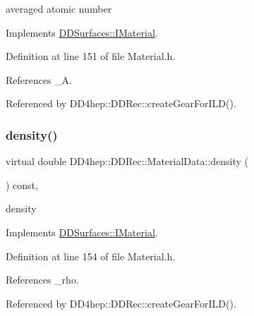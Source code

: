 averaged atomic number 



Implements \hyperlink{class_d_d_surfaces_1_1_i_material_a02f156030abe09aa3ebe9a4c99b059b2}{D\+D\+Surfaces\+::\+I\+Material}.



Definition at line 151 of file Material.\+h.



References \+\_\+A.



Referenced by D\+D4hep\+::\+D\+D\+Rec\+::create\+Gear\+For\+I\+L\+D().

\hypertarget{class_d_d4hep_1_1_d_d_rec_1_1_material_data_ad914f7bb89899a8e23bc927574b54b61}{}\label{class_d_d4hep_1_1_d_d_rec_1_1_material_data_ad914f7bb89899a8e23bc927574b54b61} 
\subsubsection{\texorpdfstring{density()}{density()}}
{\footnotesize\ttfamily virtual double D\+D4hep\+::\+D\+D\+Rec\+::\+Material\+Data\+::density (\begin{DoxyParamCaption}{ }\end{DoxyParamCaption}) const\hspace{0.3cm}{\ttfamily [inline]}, {\ttfamily [virtual]}}



density 



Implements \hyperlink{class_d_d_surfaces_1_1_i_material_ac856b9cd5ade3e0ee2720c95af766d25}{D\+D\+Surfaces\+::\+I\+Material}.



Definition at line 154 of file Material.\+h.



References \+\_\+rho.



Referenced by D\+D4hep\+::\+D\+D\+Rec\+::create\+Gear\+For\+I\+L\+D().

\hypertarget{class_d_d4hep_1_1_d_d_rec_1_1_material_data_aa0b2daf7a34cc83b58192cd0aff4dbbe}{}\label{class_d_d4hep_1_1_d_d_rec_1_1_material_data_aa0b2daf7a34cc83b58192cd0aff4dbbe} 
